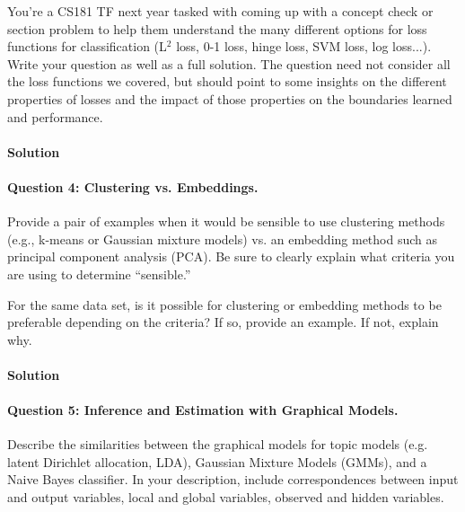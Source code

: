 \documentclass[12pt,letterpaper]{article}
\begin{document}
You’re a CS181 TF next year tasked with coming up with a concept check or section problem to help them understand the many different options for loss functions for classification (L$^2$ loss, 0-1 loss, hinge loss, SVM loss, log loss...).  Write your question as well as a full solution.  The question need not consider all the loss functions we covered, but should point to some insights on the different properties of losses and the impact of those properties on the boundaries learned and performance.

\newpage

\paragraph{Solution}


\newpage 

\paragraph{Question 4: Clustering vs. Embeddings.}

Provide a pair of examples when it would be sensible to use clustering methods (e.g., k-means or Gaussian mixture models) vs. an embedding method such as principal component analysis (PCA).  Be sure to clearly explain what criteria you are using to determine ``sensible.''  

For the same data set, is it possible for clustering or embedding methods to be preferable depending on the criteria?  If so, provide an example.  If not, explain why. 


\newpage

\paragraph{Solution}

\newpage 

\paragraph{Question 5: Inference and Estimation with Graphical Models.}

Describe the similarities between the graphical models for topic models (e.g. latent Dirichlet allocation, LDA), Gaussian Mixture Models (GMMs), and a Naive Bayes classifier.  In your description, include correspondences between input and output variables, local and global variables, observed and hidden variables.
\end{document}
